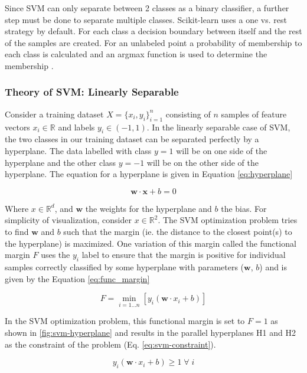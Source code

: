 Since SVM can only separate between 2 classes as a binary classifier, a further step must be done to separate multiple classes. Scikit-learn uses a one vs. rest strategy by default. For each class a decision boundary between itself and the rest of the samples are created. For an unlabeled point a probability of membership to each class is calculated and an argmax function is used to determine the membership \cite{12MulticlassMultioutput}.

\clearpage
\subsubsection{Theory of SVM: Linearly Separable}
Consider a training dataset $X = \{x_i, y_i\}^n_{i=1}$ consisting of $n$ samples of feature vectors $x_i \in \mathbb{R}$ and labels $y_i \in (-1, 1)$. In the linearly separable case of SVM, the two classes in our training dataset can be separated perfectly by a hyperplane. The data labelled with class $y=1$ will be on one side of the hyperplane and the other class $y=-1$ will be on the other side of the hyperplane. The equation for a hyperplane is given in Equation \ref{eq:hyperplane}

\begin{equation}
    \mathbf{w \cdot x} + b = 0
    \label{eq:hyperplane}
\end{equation}

Where $x \in \mathbb{R}^d$, and $\mathbf{w}$ the weights for the hyperplane and $b$ the bias. For simplicity of visualization, consider $x \in \mathbb{R}^2$. The SVM optimization problem tries to find $\mathbf{w}$ and $b$ such that the margin (ie. the distance to the closest point(s) to the hyperplane) is maximized. One variation of this margin called the functional margin $F$ uses the $y_i$ label to ensure that the margin is positive for individual samples correctly classified by some hyperplane with parameters ($\mathbf{w}$, $b$) and is given by the Equation \ref{eq:func_margin}

\begin{equation}
    F = \min_{i=1...n}{[y_i (\mathbf{w} \cdot x_i + b)]}
    \label{eq:func_margin}
\end{equation}

In the SVM optimization problem, this functional margin is set to $F=1$ as shown in \ref{fig:svm-hyperplane} and results in the parallel hyperplanes H1 and H2 as the constraint of the problem (Eq. \ref{eq:svm-constraint}).

\begin{equation}
    y_i (\mathbf{w} \cdot x_i + b) \geq 1 \; \forall \; i
    \label{eq:svm-constraint}
\end{equation}

